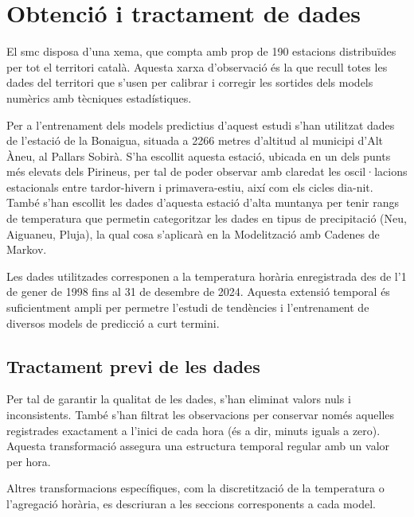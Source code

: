 \documentclass[../main.tex]{subfiles}
\begin{document}

\chapter{Obtenció i tractament de dades} \label{ch:Obtencio i tractament de dades}

El \gls{smc} disposa d’una \gls{xema}, que compta amb prop de 190 estacions distribuïdes per tot el territori català. Aquesta xarxa d’observació és la que recull totes les dades del territori que s'usen per calibrar i corregir les sortides dels models numèrics amb tècniques estadístiques. 

Per a l’entrenament dels models predictius d’aquest estudi s’han utilitzat dades de l’estació de la Bonaigua, situada a 2266 metres d’altitud al municipi d’Alt Àneu, al Pallars Sobirà. S’ha escollit aquesta estació, ubicada en un dels punts més elevats dels Pirineus, per tal de poder observar amb claredat les oscil·lacions estacionals entre tardor-hivern i primavera-estiu, així com els cicles dia-nit. També s'han escollit les dades d'aquesta  estació d'alta muntanya per tenir rangs de temperatura que permetin categoritzar les dades en tipus de precipitació (Neu, Aiguaneu, Pluja), la qual cosa s'aplicarà en la Modelització amb Cadenes de Markov.

Les dades utilitzades corresponen a la temperatura horària enregistrada des de l’1 de gener de 1998 fins al 31 de desembre de 2024. Aquesta extensió temporal és suficientment ampli per permetre l’estudi de tendències i l’entrenament de diversos models de predicció a curt termini.

\section{Tractament previ de les dades}

Per tal de garantir la qualitat de les dades, s’han eliminat valors nuls i inconsistents. També s’han filtrat les observacions per conservar només aquelles registrades exactament a l’inici de cada hora (és a dir, minuts iguals a zero). Aquesta transformació assegura una estructura temporal regular amb un valor per hora. 

Altres transformacions específiques, com la discretització de la temperatura o l’agregació horària, es descriuran a les seccions corresponents a cada model.
\end{document}
